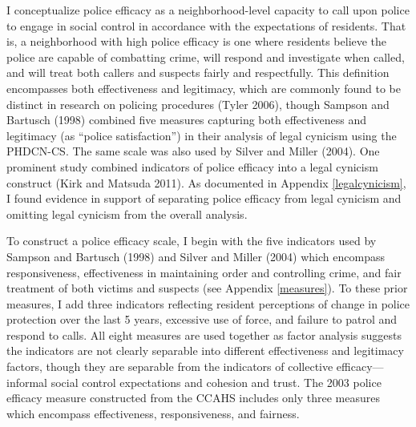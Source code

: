 \documentclass [11pt, proquest] {uwthesis}[2015/03/03]
\begin{document}
I conceptualize police efficacy as a neighborhood-level capacity to call upon police to engage in social control in accordance with the expectations of residents. That is, a neighborhood with high police efficacy is one where residents believe the police are capable of combatting crime, will respond and investigate when called, and will treat both callers and suspects fairly and respectfully. This definition encompasses both effectiveness and legitimacy, which are commonly found to be distinct in research on policing procedures (Tyler 2006), though Sampson and Bartusch (1998) combined five measures capturing both effectiveness and legitimacy (as ``police satisfaction'') in their analysis of legal cynicism using the PHDCN-CS. The same scale was also used by Silver and Miller (2004). One prominent study combined indicators of police efficacy into a legal cynicism construct (Kirk and Matsuda 2011). As documented in Appendix \ref{legalcynicism}, I found evidence in support of separating police efficacy from legal cynicism and omitting legal cynicism from the overall analysis.

To construct a police efficacy scale, I begin with the five indicators used by Sampson and Bartusch (1998) and Silver and Miller (2004) which encompass responsiveness, effectiveness in maintaining order and controlling crime, and fair treatment of both victims and suspects (see Appendix \ref{measures}). To these prior measures, I add three indicators reflecting resident perceptions of change in police protection over the last 5 years, excessive use of force, and failure to patrol and respond to calls. All eight measures are used together as factor analysis suggests the indicators are not clearly separable into different effectiveness and legitimacy factors, though they are separable from the indicators of collective efficacy---informal social control expectations and cohesion and trust. The 2003 police efficacy measure constructed from the CCAHS includes only three measures which encompass effectiveness, responsiveness, and fairness.
\end{document}
